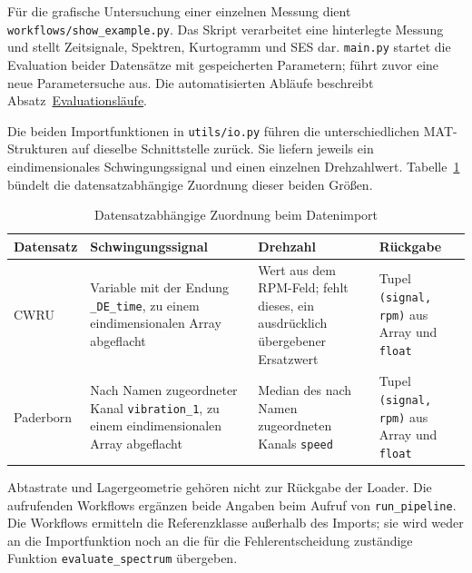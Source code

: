 Für die grafische Untersuchung einer einzelnen Messung dient
\texttt{workflows/show\_example.py}. Das Skript verarbeitet eine hinterlegte
Messung und stellt Zeitsignale, Spektren, Kurtogramm und SES dar.
\texttt{main.py} startet die Evaluation beider Datensätze mit gespeicherten
Parametern;  führt zuvor eine neue
Parametersuche aus. Die automatisierten Abläufe beschreibt
Absatz~\hyperref[subsec:evaluationslaeufe_impl]{Evaluationsläufe}.
\par\endgroup

\label{sec:datenimport}
Die beiden Importfunktionen in \texttt{utils/io.py} führen die
unterschiedlichen MAT-Strukturen auf dieselbe Schnittstelle zurück. Sie
liefern jeweils ein eindimensionales Schwingungssignal und einen einzelnen
Drehzahlwert. Tabelle~\ref{tab:datenimport_impl} bündelt die datensatzabhängige
Zuordnung dieser beiden Größen.

\begin{table}[htbp]
  \centering
  \small
  \setlength{\aboverulesep}{0pt}
  \setlength{\belowrulesep}{0pt}
  \setlength{\doublerulesep}{0pt}
  \renewcommand{\arraystretch}{1.15}
  \caption{Datensatzabhängige Zuordnung beim Datenimport}
  \label{tab:datenimport_impl}
  \begin{tabularx}{\textwidth}{|
      >{\raggedright\arraybackslash}p{2.0cm}|
      >{\raggedright\arraybackslash}X|
      >{\raggedright\arraybackslash}X|
      >{\raggedright\arraybackslash}p{3.0cm}|}
    \hline
    \textbf{Datensatz} & \textbf{Schwingungssignal} &
    \textbf{Drehzahl} & \textbf{Rückgabe} \\
    \toprule\toprule
    CWRU & Variable mit der Endung \texttt{\_DE\_time}, zu einem
    eindimensionalen Array abgeflacht & Wert aus dem RPM-Feld; fehlt dieses,
    ein ausdrücklich übergebener Ersatzwert &
    Tupel \texttt{(signal, rpm)} aus Array und \texttt{float} \\
    \hline
    Paderborn & Nach Namen zugeordneter Kanal
    \texttt{vibration\_1}, zu einem eindimensionalen Array abgeflacht &
    Median des nach Namen zugeordneten Kanals \texttt{speed} &
    Tupel \texttt{(signal, rpm)} aus Array und \texttt{float} \\
    \hline
  \end{tabularx}
\end{table}

Abtastrate und Lagergeometrie gehören nicht zur Rückgabe der Loader. Die
aufrufenden Workflows ergänzen beide Angaben beim Aufruf von
\texttt{run\_pipeline}. Die Workflows ermitteln die Referenzklasse außerhalb
des Imports; sie wird weder an die Importfunktion noch an die für die
Fehlerentscheidung zuständige Funktion \texttt{evaluate\_spectrum} übergeben.

